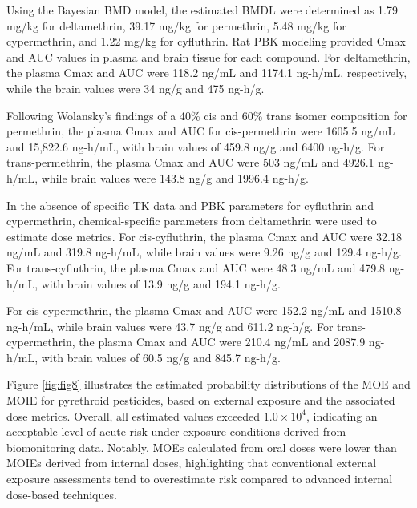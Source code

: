 \documentclass[toxics,article,submit,pdftex,moreauthors]{Definitions/mdpi}
\begin{document}
Using the Bayesian BMD model, the estimated BMDL were determined as 1.79 mg/kg for deltamethrin,
39.17 mg/kg for permethrin, 5.48 mg/kg for cypermethrin, and 1.22 mg/kg
for cyfluthrin. Rat PBK modeling provided Cmax and AUC values in plasma
and brain tissue for each compound. For deltamethrin, the plasma Cmax
and AUC were 118.2 ng/mL and 1174.1 ng-h/mL, respectively, while the
brain values were 34 ng/g and 475 ng-h/g.

Following Wolansky's findings of a 40\% cis and 60\% trans isomer
composition for permethrin, the plasma Cmax and AUC for cis-permethrin
were 1605.5 ng/mL and 15,822.6 ng-h/mL, with brain values of 459.8 ng/g
and 6400 ng-h/g. For trans-permethrin, the plasma Cmax and AUC were 503
ng/mL and 4926.1 ng-h/mL, while brain values were 143.8 ng/g and 1996.4
ng-h/g.

In the absence of specific TK data and PBK parameters
for cyfluthrin and cypermethrin, chemical-specific parameters from
deltamethrin were used to estimate dose metrics. For cis-cyfluthrin, the
plasma Cmax and AUC were 32.18 ng/mL and 319.8 ng-h/mL, while brain
values were 9.26 ng/g and 129.4 ng-h/g. For trans-cyfluthrin, the plasma
Cmax and AUC were 48.3 ng/mL and 479.8 ng-h/mL, with brain values of
13.9 ng/g and 194.1 ng-h/g.

For cis-cypermethrin, the plasma Cmax and AUC were 152.2 ng/mL and
1510.8 ng-h/mL, while brain values were 43.7 ng/g and 611.2 ng-h/g. For
trans-cypermethrin, the plasma Cmax and AUC were 210.4 ng/mL and 2087.9
ng-h/mL, with brain values of 60.5 ng/g and 845.7 ng-h/g.

Figure \ref{fig:fig8} illustrates the estimated probability
distributions of the MOE and MOIE for pyrethroid pesticides, based on
external exposure and the associated dose metrics. Overall, all
estimated values exceeded \(1.0 \times 10^{4}\), indicating an
acceptable level of acute risk under exposure conditions derived from
biomonitoring data. Notably, MOEs calculated from oral doses were lower
than MOIEs derived from internal doses, highlighting that conventional
external exposure assessments tend to overestimate risk compared to
advanced internal dose-based techniques.
\end{document}

